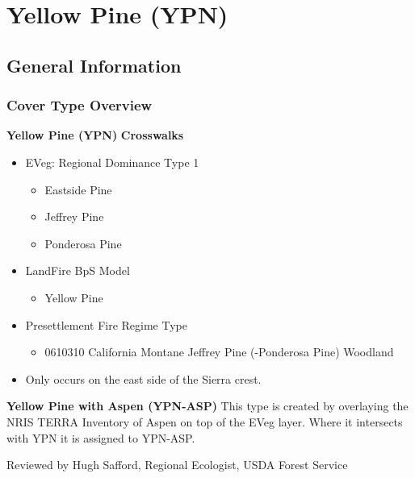 \newpage
\section{Yellow Pine (YPN)}
\label{ypn-description}

\subsection*{General Information}

\subsubsection{Cover Type Overview}

\textbf{Yellow Pine (YPN)}
\newline
\textbf{Crosswalks}
\begin{itemize}
	\item EVeg: Regional Dominance Type 1
	\begin{itemize}
		\item Eastside Pine
		\item Jeffrey Pine
		\item Ponderosa Pine
	\end{itemize}

	\item LandFire BpS Model
	\begin{itemize}
		\item Yellow Pine
	\end{itemize}

	\item Presettlement Fire Regime Type
	\begin{itemize}
		\item 0610310 California Montane Jeffrey Pine (-Ponderosa Pine) Woodland
	\end{itemize}

	\item Only occurs on the east side of the Sierra crest.
\end{itemize}

\noindent \textbf{Yellow Pine with Aspen (YPN-ASP)}
\newline
This type is created by overlaying the NRIS TERRA Inventory of Aspen on top of the EVeg layer. Where it intersects with YPN it is assigned to YPN-ASP.

\noindent Reviewed by Hugh Safford, Regional Ecologist, USDA Forest Service

